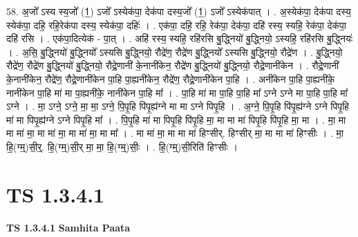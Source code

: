 \documentclass[17pt]{extarticle}
\begin{document}
58. अ॒जो᳚ ऽस्य स्य॒जो᳚ (1॒) ऽजो᳚ ऽस्येक॑पा॒ देक॑पा दस्य॒जो᳚ (1॒) ऽजो᳚ ऽस्येक॑पात् । . अ॒स्येक॑पा॒ देक॑पा दस्य॒ स्येक॑पा॒ दहि॒ रहि॒रेक॑पा दस्य॒ स्येक॑पा॒ दहिः॑ । . एक॑पा॒ दहि॒ रहि॒ रेक॑पा॒ देक॑पा॒ दहि॑ रस्य॒ स्यहि॒ रेक॑पा॒ देक॑पा॒ दहि॑ रसि । . एक॑पा॒दित्येक॑ - पा॒त् । . अहि॑ रस्य॒ स्यहि॒ रहि॑रसि बु॒द्ध्नियो॑ बु॒द्ध्नियो॒ ऽस्यहि॒ रहि॑रसि बु॒द्ध्नियः॑ । . अ॒सि॒ बु॒द्ध्नियो॑ बु॒द्ध्नियो᳚ ऽस्यसि बु॒द्ध्नियो॒ रौद्रे॑ण॒ रौद्रे॑ण बु॒द्ध्नियो᳚ ऽस्यसि बु॒द्ध्नियो॒ रौद्रे॑ण । . बु॒द्ध्नियो॒ रौद्रे॑ण॒ रौद्रे॑ण बु॒द्ध्नियो॑ बु॒द्ध्नियो॒ रौद्रे॒णानी॑ के॒नानी॑केन॒ रौद्रे॑ण बु॒द्ध्नियो॑ बु॒द्ध्नियो॒ रौद्रे॒णानी॑केन । . रौद्रे॒णानी॑ के॒नानी॑केन॒ रौद्रे॑ण॒ रौद्रे॒णानी॑केन पा॒हि पा॒ह्यनी॑केन॒ रौद्रे॑ण॒ रौद्रे॒णानी॑केन पा॒हि । . अनी॑केन पा॒हि पा॒ह्यनी॑के॒ नानी॑केन पा॒हि मा॑ मा पा॒ह्यनी॑के॒ नानी॑केन पा॒हि मा᳚ । . पा॒हि मा॑ मा पा॒हि पा॒हि मा᳚ ऽग्ने ऽग्ने मा पा॒हि पा॒हि मा᳚ ऽग्ने । . मा॒ ऽग्ने॒ ऽग्ने॒ मा॒ मा॒ ऽग्ने॒ पि॒पृ॒हि पि॑पृ॒ह्य॑ग्ने मा मा ऽग्ने पिपृ॒हि । . अ॒ग्ने॒ पि॒पृ॒हि पि॑पृ॒ह्य॑ग्ने ऽग्ने पिपृ॒हि मा॑ मा पिपृ॒ह्य॑ग्ने ऽग्ने पिपृ॒हि मा᳚ । . पि॒पृ॒हि मा॑ मा पिपृ॒हि पि॑पृ॒हि मा॒ मा मा मा॑ पिपृ॒हि पि॑पृ॒हि मा॒ मा । . मा॒ मा मा मा॑ मा॒ मा मा॑ मा॒ मा मा॑ मा॒ मा मा᳚ । . मा मा॑ मा॒ मा मा मा॑ हिꣳसीर्. हिꣳसीर् मा॒ मा मा मा॑ हिꣳसीः । . मा॒ हि॒(ग्म्॒)सी॒र्॒. हि॒(ग्म्॒)सी॒र् मा॒ मा॒ हि॒(ग्म्॒)सीः॒ । . हि॒(ग्म्॒)सी॒रिति॑ हिꣳसीः । \newline
\pagebreak
{}
\section*{ TS 1.3.4.1 }

\textbf{TS 1.3.4.1 } \newline
\textbf{Samhita Paata} \newline
\end{document}
